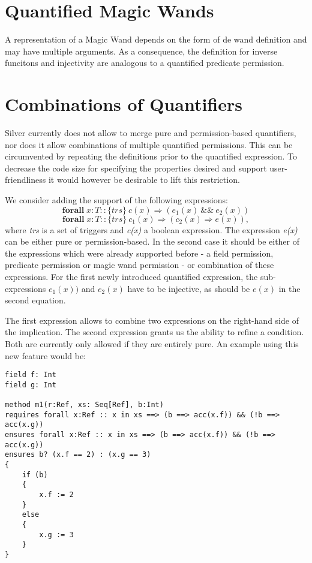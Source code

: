 \documentclass[12pt]{article}
\begin{document}
\section{Quantified Magic Wands}
A representation of a Magic Wand\cite{magicwand} depends on the form of de wand definition and may have multiple arguments. As a consequence, the definition for inverse funcitons and injectivity are analogous to a quantified predicate permission.


\section{Combinations of Quantifiers}
Silver currently does not allow to merge pure and permission-based quantifiers, nor does it allow combinations of multiple quantified permissions. This can be circumvented by repeating the definitions prior to the quantified expression.
To decrease the code size for specifying the properties desired and support user-friendliness it would however be desirable to lift this restriction.

We consider adding the support of the following expressions:
\begin{equation}
\label{eq1}
	\mathbf{forall} \; x:T :: \{trs\}\  c(x) \Rightarrow (e_1(x)\ \&\& \ e_2(x))
\end{equation}
\begin{equation}
\label{eq2}
	\mathbf{forall} \; x:T ::  \{trs\}\ c_1(x) \Rightarrow (c_2(x) \Rightarrow e(x)),
\end{equation}
where {\it trs} is a set of triggers and {\it c(x)} a boolean expression. The expression {\it e(x)} can be either pure or permission-based. In the second case it should be either of the expressions which were already supported before - a field permission, predicate permission or magic wand permission - or combination of these expressions. For the first newly introduced quantified expression, the sub-expressions \(e_1(x))\) and \(e_2(x)\) have to be injective, as should be \( e(x)\) in the second equation.

The first expression allows to combine two expressions on the right-hand side of the implication. The second expression  grants us the ability to refine a condition. Both are currently only allowed if they are entirely pure. An example using this new feature would be: 

\begin{lstlisting}
field f: Int
field g: Int

method m1(r:Ref, xs: Seq[Ref], b:Int)
requires forall x:Ref :: x in xs ==> (b ==> acc(x.f)) && (!b ==> acc(x.g))
ensures forall x:Ref :: x in xs ==> (b ==> acc(x.f)) && (!b ==> acc(x.g))
ensures b? (x.f == 2) : (x.g == 3)
{
    if (b)
    {
        x.f := 2
    }
    else
    {
        x.g := 3
    }
}
\end{lstlisting}
\end{document}
